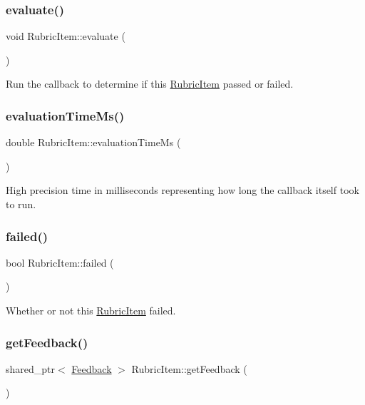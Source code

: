 \subsubsection{\texorpdfstring{evaluate()}{evaluate()}}
{\footnotesize\ttfamily void Rubric\+Item\+::evaluate (\begin{DoxyParamCaption}{ }\end{DoxyParamCaption})}

Run the callback to determine if this \hyperlink{class_rubric_item}{Rubric\+Item} passed or failed. \hypertarget{class_rubric_item_a34a18531cc098667fb47e440b876dc18}{}\label{class_rubric_item_a34a18531cc098667fb47e440b876dc18} 
\subsubsection{\texorpdfstring{evaluation\+Time\+Ms()}{evaluationTimeMs()}}
{\footnotesize\ttfamily double Rubric\+Item\+::evaluation\+Time\+Ms (\begin{DoxyParamCaption}{ }\end{DoxyParamCaption})}

High precision time in milliseconds representing how long the callback itself took to run. \hypertarget{class_rubric_item_af5675f379ed58476fada3ce92ee698f0}{}\label{class_rubric_item_af5675f379ed58476fada3ce92ee698f0} 
\subsubsection{\texorpdfstring{failed()}{failed()}}
{\footnotesize\ttfamily bool Rubric\+Item\+::failed (\begin{DoxyParamCaption}{ }\end{DoxyParamCaption})}

Whether or not this \hyperlink{class_rubric_item}{Rubric\+Item} failed. \hypertarget{class_rubric_item_a5857824365c39b6c00e8f0f156923955}{}\label{class_rubric_item_a5857824365c39b6c00e8f0f156923955} 
\subsubsection{\texorpdfstring{get\+Feedback()}{getFeedback()}}
{\footnotesize\ttfamily shared\+\_\+ptr$<$ \hyperlink{class_feedback}{Feedback} $>$ Rubric\+Item\+::get\+Feedback (\begin{DoxyParamCaption}{ }\end{DoxyParamCaption})}

